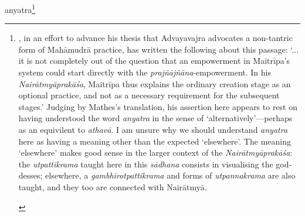 \documentclass[naipra.tex]{subfiles}
\begin{document}
\begin{sanskrit}


\pstart
anyatra\footnote{\begin{english}
	\textcites[374]{mathes2014}[132]{mathes2021}, in an effort to advance his thesis that Advayavajra advocates a non-tantric form of Mahāmudrā practice, has written the following about this passage: `... it is not completely out of the question that an empowerment in Maitrīpa's system could start directly with the \emph{prajñājñāna}-empowerment. In his \emph{Nairātmyāprakāśa}, Maitrīpa thus explains the ordinary creation stage as an optional practice, and not as a necessary requirement for the subsequent stages.' 
	Judging by Mathes's translation, his assertion here appears to rest on having understood the word \emph{anyatra} in the sense of `alternatively'—perhaps as an equivilent to \emph{athavā}.
	I am unsure why we should understand \emph{anyatra} here as having a meaning other than the expected `elsewhere'.
	The meaning `elsewhere' makes good sense in the larger context of the \emph{Nairātmyāprakāśa}: the \emph{utpattikrama} taught here in this \emph{sādhana} consists in visualising the goddesses; elsewhere, a \emph{gambhīrotpattikrama} and forms of \emph{utpannakrama} are also taught, and they too are connected with Nairātmyā.


\end{english}}
\end{sanskrit}
\end{document}
